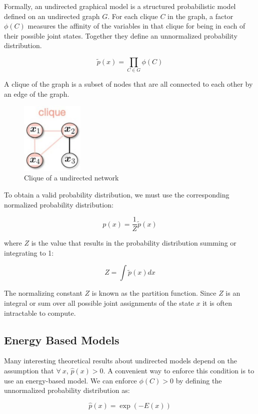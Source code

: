 \newpage

\noindent Formally, an undirected graphical model is a structured probabilistic model defined on an undirected graph $G$. For each clique $C$ in the graph, a factor $\phi(C)$ measures the affinity of the variables in that clique for being in each of their possible joint states. Together they deﬁne an unnormalized probability distribution.

$$ \tilde{p}(x) = \prod_{C \in G} \phi(C)  $$


\noindent A clique of the graph is a subset of nodes that are all connected to each other by an edge of the graph.

\begin{figure}[h]
    \centering
    \includegraphics[width=3cm]{Images/clique.jpg}
    \caption{Clique of a undirected network}
    \label{fig:clique}
\end{figure}

\noindent To obtain a valid probability distribution, we must use the corresponding normalized probability distribution:

$$ p(x) = \frac{1}{Z} \tilde{p} (x)$$

where $Z$ is the value that results in the probability distribution summing or integrating to 1:

$$ Z = \int{ \tilde{p}(x) dx }$$

\noindent The normalizing constant $Z$ is known as the partition function. Since $Z$ is an integral or sum over all possible joint assignments of the state $x$ it is often intractable to compute.

\subsection{Energy Based Models}

Many interesting theoretical results about undirected models depend on the assumption that $\forall ~ x $, $\hat{p} (x) > 0$. A convenient way to enforce this condition is to use an energy-based model. We can enforce $\phi(C) > 0$ by defining the unnormalized probability distribution as: 

$$ \hat{p}(x) = \exp{(-E(x))} $$

